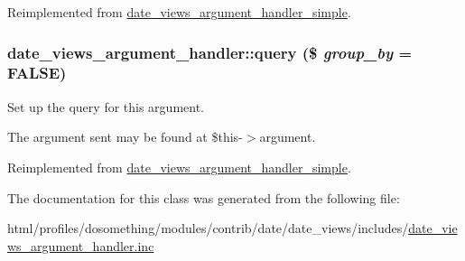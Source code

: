 Reimplemented from \hyperlink{classdate__views__argument__handler__simple_a69e0df0155f42ffff2722fa1bc4b7f7b}{date\_\-views\_\-argument\_\-handler\_\-simple}.\hypertarget{classdate__views__argument__handler_aa7df86c9e200ef7e797e1ba4f2fa1158}{
\subsubsection[{query}]{\setlength{\rightskip}{0pt plus 5cm}date\_\-views\_\-argument\_\-handler::query (\$ {\em group\_\-by} = {\ttfamily FALSE})}}
\label{classdate__views__argument__handler_aa7df86c9e200ef7e797e1ba4f2fa1158}
Set up the query for this argument.

The argument sent may be found at \$this-\/$>$argument. 

Reimplemented from \hyperlink{classdate__views__argument__handler__simple_a284da1e34334bd9086194eef7a803d27}{date\_\-views\_\-argument\_\-handler\_\-simple}.

The documentation for this class was generated from the following file:\begin{DoxyCompactItemize}
\item 
html/profiles/dosomething/modules/contrib/date/date\_\-views/includes/\hyperlink{date__views__argument__handler_8inc}{date\_\-views\_\-argument\_\-handler.inc}\end{DoxyCompactItemize}
